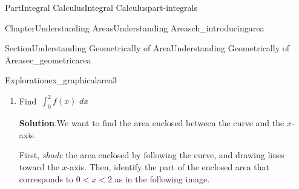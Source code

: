 \documentclass{tufte-book}
\newcommand{\blocktitlefont}{\relax}
\numberwithin{equation}{chapter}
\newcommand{\intdx}[1]{{\,\int#1\,\,dx}}
\newcommand{\lt}{<}
\begin{document}
\begin{partptx}{Part}{Integral Calculus}{}{Integral Calculus}{}{}{part-integrals}
\begin{chapterptx}{Chapter}{Understanding Areas}{}{Understanding Areas}{}{}{ch_introducingarea}
\begin{sectionptx}{Section}{Understanding Geometrically of Area}{}{Understanding Geometrically of Area}{}{}{sec_geometricarea}
\begin{exploration}{Exploration}{}{ex_graphicalarea3}
\begin{enumerate}[font=\bfseries,label=(\alph*),ref=\alph*]
\begin{image}{0.25}{0.5}{0.25}{}
{
}%
\end{image}%
The shaded area is a triangle with base \(b=1\) and height \(h=1\). The region enclosed is \emph{above} the \(x\)-axis so it has \emph{positive} net area. Putting this together,%
\begin{equation*}
\intdx{_0^1 f(x) } = (+) \frac{1}{2}\cdot 1 \cdot 1 = 0.5
\end{equation*}
%
\item{}Find \(\intdx{_0^2 f(x) }\)%
\par\smallskip%
\noindent\textbf{\blocktitlefont Solution}.\hypertarget{ex_graphicalarea3-3-2}{}\quad{}We want to find the area enclosed between the curve and the \(x\)-axis.%
\par
First, \emph{shade} the area enclosed by following the curve, and drawing lines toward the \(x\)-axis. Then, identify the part of the enclosed area that corresponds to \(0\lt x \lt 2\) as in the following image.%
\begin{image}{0.25}{0.5}{0.25}{}%
\end{image}
\end{enumerate}
\end{exploration}
\end{sectionptx}
\end{chapterptx}
\end{partptx}
\end{document}
